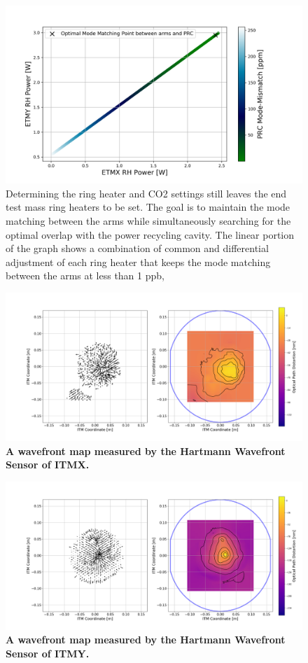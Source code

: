 \begin{figure}[ht]
\centering
\includegraphics[width=1.0 \textwidth]{../Figures/ETM_TCS_Settings.png}
\caption{Determining the ring heater and CO2 settings still leaves the end test mass ring heaters to be set.  The goal is to maintain the mode matching between the arms while simultaneously searching for the optimal overlap with the power recycling cavity. The linear portion of the graph shows a combination of common and differential adjustment of each ring heater that keeps the mode matching between the arms at less than 1 ppb, }
\label{fig:TCS_ETM}
\end{figure}

\begin{figure}[ht]
	\centering
	\includegraphics[width=.7 \textwidth]{../Figures/ITMX_20W_abs.png}
	\caption[A wavefront map measured by the Hartmann Wavefront Sensor of ITMX.]  
	{\textbf{A wavefront map measured by the Hartmann Wavefront Sensor of ITMX.}}
	\label{fig:ITMX_WF}
\end{figure}

\begin{figure}[ht]
	\centering
	\includegraphics[width=.7 \textwidth]{../Figures/ITMY_20W_abs.png}
	\caption[A wavefront map measured by the Hartmann Wavefront Sensor of ITMY.]  
	{\textbf{A wavefront map measured by the Hartmann Wavefront Sensor of ITMY.}}
	\label{fig:ITMY_WF}
\end{figure}
